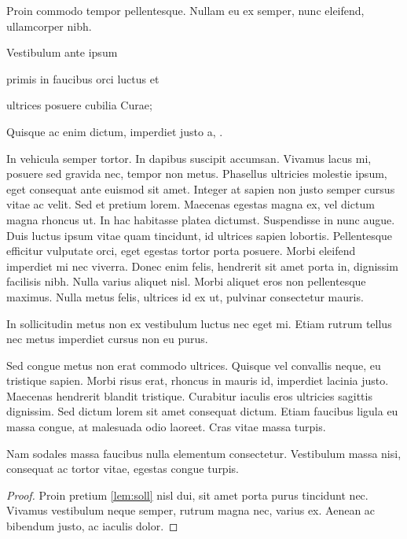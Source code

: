 \documentclass[a4paper,twoside,notitlepage,openright,11pt]{report}
\begin{document}
\begin{definition}
  Proin commodo tempor pellentesque. Nullam eu ex semper,  nunc eleifend, ullamcorper nibh.
  \begin{thmlist}
  \item Vestibulum ante ipsum
  \item primis in faucibus orci luctus et
  \item ultrices posuere cubilia Curae;
  \end{thmlist}
  Quisque ac enim dictum, imperdiet justo a, .
\end{definition}
In vehicula semper tortor. In dapibus suscipit accumsan. Vivamus lacus mi, posuere sed gravida nec, tempor non metus. Phasellus ultricies molestie ipsum, eget consequat ante euismod sit amet. Integer at sapien non justo semper cursus vitae ac velit. Sed et pretium lorem. Maecenas egestas magna ex, vel dictum magna rhoncus ut. In hac habitasse platea dictumst. Suspendisse in nunc augue. Duis luctus ipsum vitae quam tincidunt, id ultrices sapien lobortis. Pellentesque efficitur vulputate orci, eget egestas tortor porta posuere. Morbi eleifend imperdiet mi nec viverra. Donec enim felis, hendrerit sit amet porta in, dignissim facilisis nibh. Nulla varius aliquet nisl. Morbi aliquet eros non pellentesque maximus. Nulla metus felis, ultrices id ex ut, pulvinar consectetur mauris.

\begin{lemma}
  \label{lem:soll}
  In sollicitudin metus non ex vestibulum luctus nec eget mi. Etiam rutrum tellus nec metus imperdiet cursus non eu purus.
\end{lemma}

Sed congue metus non erat commodo ultrices. Quisque vel convallis neque, eu tristique sapien. Morbi risus erat, rhoncus in mauris id, imperdiet lacinia justo. Maecenas hendrerit blandit tristique. Curabitur iaculis eros ultricies sagittis dignissim. Sed dictum lorem sit amet consequat dictum. Etiam faucibus ligula eu massa congue, at malesuada odio laoreet. Cras vitae massa turpis.

\begin{theorem}
  Nam sodales massa faucibus nulla elementum consectetur. Vestibulum massa nisi, consequat ac tortor vitae, egestas congue turpis.
\end{theorem}
\begin{proof}
    Proin pretium \cref{lem:soll} nisl dui, sit amet porta purus tincidunt nec. Vivamus vestibulum neque semper, rutrum magna nec, varius ex. Aenean ac bibendum justo, ac iaculis dolor. 
\end{proof}
\end{document}
